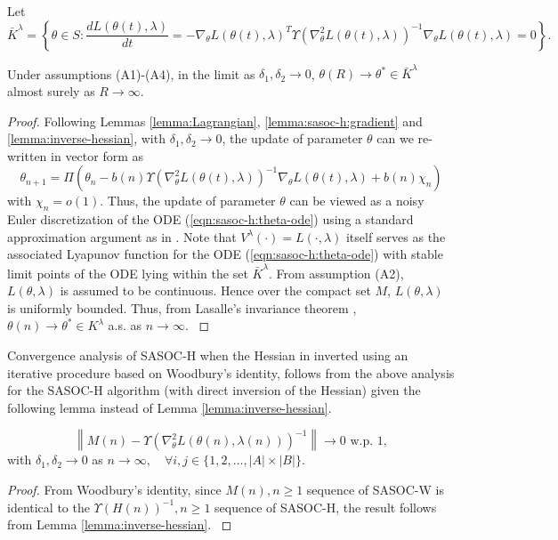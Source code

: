 \documentclass[11pt,letterpaper,english]{article}
\begin{document}
Let \[\bar{K}^\lambda = \left \{ \theta \in S: \dfrac{d L (\theta(t), \lambda)}{dt} = - \nabla_{\theta} L (\theta(t), \lambda)^T \Upsilon(\nabla^2_\theta L(\theta(t), \lambda))^{-1} \nabla_\theta L(\theta(t), \lambda) = 0 \right \}.\]
\begin{theorem}
Under assumptions (A1)-(A4), in the limit as $\delta_1, \delta_2 \rightarrow 0$,
$\theta(R) \rightarrow \theta^* \in \bar{K}^{\lambda}$ almost surely as $R \rightarrow \infty$.
\begin{proof}
{\rm
Following Lemmas \ref{lemma:Lagrangian}, \ref{lemma:sasoc-h:gradient} and \ref{lemma:inverse-hessian}, with $\delta_1, \delta_2 \rightarrow 0$, the update of parameter $\theta$ can we re-written in vector form as
\[ \theta_{n + 1} = \Pi \left ( \theta_n - b(n) \Upsilon(\nabla^2_\theta L(\theta(t), \lambda))^{-1} \nabla_\theta L(\theta(t), \lambda) + b(n) \chi_n \right )\]
with $\chi_n = o(1)$. Thus, the update of parameter $\theta$ can be viewed as a noisy Euler discretization of the ODE (\ref{eqn:sasoc-h:theta-ode}) using a standard approximation argument as in \cite[pp. 191-196]{kushner-clark}. Note that $V^\lambda(\cdot) = L(\cdot, \lambda)$ itself serves as the associated Lyapunov function \cite[pp. 75]{kushner-yin} for the ODE (\ref{eqn:sasoc-h:theta-ode}) with stable limit points of the ODE lying within the set $\bar{K}^\lambda$. From assumption (A2), $L(\theta, \lambda)$ is assumed to be continuous. Hence over the compact set $M$, $L(\theta, \lambda)$ is uniformly bounded. Thus, from Lasalle's invariance theorem \cite{lasalle}, $\theta(n) \rightarrow \theta^* \in K^{\lambda}$ a.s. as $n \rightarrow \infty$.
}
\end{proof}
\end{theorem}



Convergence analysis of SASOC-H when the Hessian in inverted using an iterative procedure based on Woodbury's identity, follows from the above analysis for the SASOC-H algorithm (with direct inversion of the Hessian) given the following lemma instead of Lemma \ref{lemma:inverse-hessian}.

\begin{lemma}
\label{lemma:sasoc-w-inverse-hessian}
\[\left \| M(n) - \Upsilon(\nabla^2_{\theta} L(\theta(n), \lambda(n)))^{-1} \right \| \rightarrow 0\textrm{ w.p. 1},
\]
with $\delta_1, \delta_2 \rightarrow 0$ as $n \rightarrow \infty, \quad \forall i, j \in \{1, 2, \dots, |A| \times |B| \}$.
\begin{proof}
{\rm
From Woodbury's identity, since $M(n), n \ge 1$ sequence of SASOC-W is identical to the $\Upsilon(H(n))^{-1}, n \ge 1$ sequence of SASOC-H, the result follows from Lemma \ref{lemma:inverse-hessian}.
}
\end{proof}
\end{lemma}
 



\end{document}
